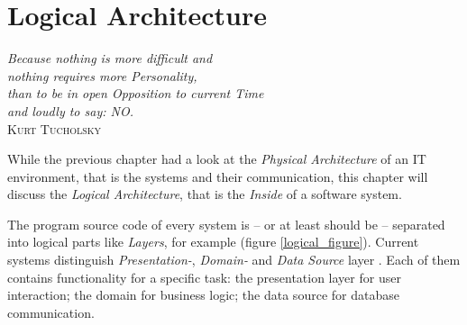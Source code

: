 %
%
%
%
%
%
%

\chapter{Logical Architecture}
\label{logical_architecture_heading}

\begin{flushright}
    \textsl{
        Because nothing is more difficult and\\
        nothing requires more Personality,\\
        than to be in open Opposition to current Time\\
        and loudly to say: NO.
    }\\
    \textsc{Kurt Tucholsky}
\end{flushright}

While the previous chapter had a look at the \emph{Physical Architecture} of an
IT environment, that is the systems and their communication, this chapter will
discuss the \emph{Logical Architecture}, that is the \emph{Inside} of a software
system.

The program source code of every system is -- or at least should be -- separated
into logical parts like \emph{Layers}, for example (figure \ref{logical_figure}).
Current systems distinguish \emph{Presentation-}, \emph{Domain-} and
\emph{Data Source} layer \cite{fowler2002}. Each of them contains functionality
for a specific task: the presentation layer for user interaction; the domain for
business logic; the data source for database communication.

